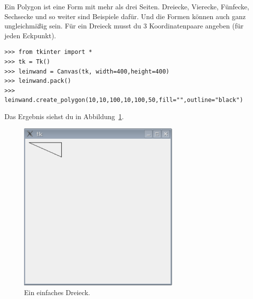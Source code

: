 Ein Polygon ist eine Form mit mehr als drei Seiten. Dreiecke, Vierecke, Fünfecke, Sechsecke und so weiter sind Beispiele dafür. Und die Formen können auch ganz ungleichmäßig sein. Für ein Dreieck musst du 3 Koordinatenpaare angeben (für jeden Eckpunkt). 

\begin{Verbatim}[frame=single]
>>> from tkinter import *
>>> tk = Tk()
>>> leinwand = Canvas(tk, width=400,height=400)
>>> leinwand.pack()
>>> leinwand.create_polygon(10,10,100,10,100,50,fill="",outline="black")
\end{Verbatim}

Das Ergebnis siehst du in Abbildung~\ref{fig41}.

\begin{figure}
\begin{center}
\includegraphics[width=80mm]{images/figure41}
\end{center}
\caption{Ein einfaches Dreieck.}\label{fig41}
\end{figure}

